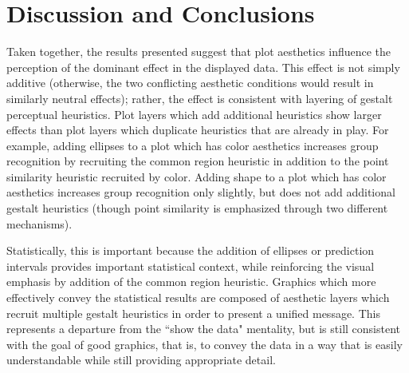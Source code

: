 \documentclass[12pt]{article}\usepackage[]{graphicx}\usepackage[]{color}
\begin{document}


\section{Discussion and Conclusions}\label{sec:Conclusion}

Taken together, the results presented suggest that plot aesthetics influence the perception of the dominant effect in the displayed data. 
This effect is not simply additive (otherwise, the two conflicting aesthetic conditions would result in similarly neutral effects); rather, the effect is consistent with layering of gestalt perceptual heuristics. 
Plot layers which add additional heuristics show larger effects than plot layers which duplicate heuristics that are already in play. 
For example, adding ellipses to a plot which has color aesthetics increases group recognition by recruiting the common region heuristic in addition to the point similarity heuristic recruited by color. 
Adding shape to a plot which has color aesthetics increases group recognition only slightly, but does not add additional gestalt heuristics (though point similarity is emphasized through two different mechanisms). 

Statistically, this is important because the addition of ellipses or prediction intervals provides important statistical context, while reinforcing the visual emphasis by addition of the common region heuristic. Graphics which more effectively convey the statistical results are composed of aesthetic layers which recruit multiple gestalt heuristics in order to present a unified message. This represents a departure from the ``show the data" mentality, but is still consistent with the goal of good graphics, that is, to convey the data in a way that is easily understandable while still providing appropriate detail. 
\end{document}

